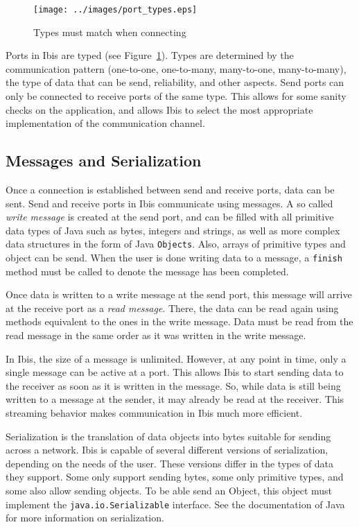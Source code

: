 \documentclass[10pt]{article}
\begin{document}
\begin{figure} \centering
\texttt{[image: ../images/port\_types.eps]}
\caption{\label{port_types}Types must match when connecting} 
\end{figure}

Ports in Ibis are typed (see Figure~\ref{port_types}). Types are
determined by the communication pattern (one-to-one, one-to-many,
many-to-one, many-to-many), the type of data that can be send,
reliability, and other aspects. Send ports can only be connected to receive
ports of the same type. This allows for some sanity checks on the
application, and allows Ibis to select the most appropriate
implementation of the communication channel.

\subsection{Messages and Serialization}


Once a connection is established between send and receive ports, data
can be sent. Send and receive ports in Ibis communicate using
messages. A so called \emph{write message} is created at the send port,
and can be filled with all primitive data types of Java such as bytes, integers
and strings, as well as more complex data structures in the form of
Java \texttt{Objects}. Also, arrays of primitive types and object can be
send. When the user is done writing data to a message, a \texttt{finish}
method must be called to denote the message has been completed.

Once data is written to a write message at the send port, this message
will arrive at the receive port as a \emph{read message}. There, the
data can be read again using methods equivalent to the ones in the write
message. Data must be read from the read message in the same order as it
was written in the write message.

In Ibis, the size of a message is unlimited. However, at any point in
time, only a single message can be active at a port. This allows Ibis to
start sending data to the receiver as soon as it is written in the
message. So, while data is still being written to a message at the
sender, it may already be read at the receiver. This streaming behavior
makes communication in Ibis much more efficient.

Serialization is the translation of data objects into bytes suitable for
sending across a network. Ibis is capable of several different versions
of serialization, depending on the needs of the user. These versions
differ in the types of data they support. Some only support sending
bytes, some only primitive types, and some also allow sending objects.
To be able send an Object, this object must implement the
\texttt{java.io.Serializable} interface. See the documentation of Java
for more information on serialization.
\end{document}
